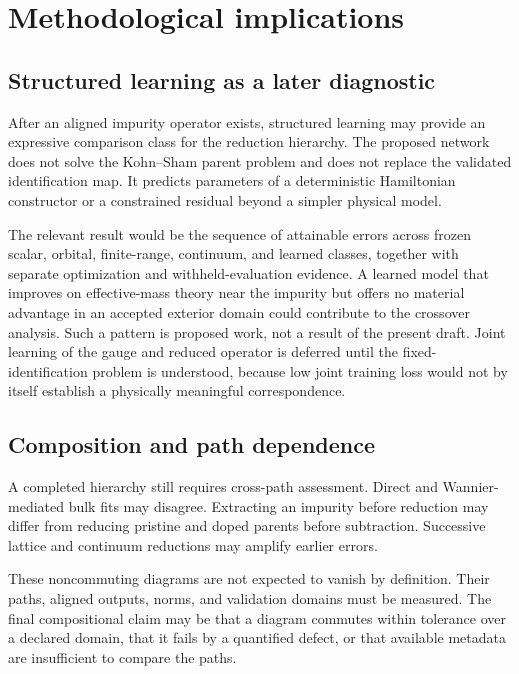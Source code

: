 \section{Methodological implications}

\subsection{Structured learning as a later diagnostic}

After an aligned impurity operator exists, structured learning may provide an
expressive comparison class for the reduction hierarchy. The proposed network
does not solve the Kohn--Sham parent problem and does not replace the validated
identification map. It predicts parameters of a deterministic Hamiltonian
constructor or a constrained residual beyond a simpler physical model.

The relevant result would be the sequence of attainable errors across frozen
scalar, orbital, finite-range, continuum, and learned classes, together with
separate optimization and withheld-evaluation evidence. A learned model that
improves on effective-mass theory near the impurity but offers no material
advantage in an accepted exterior domain could contribute to the crossover
analysis. Such a pattern is proposed work, not a result of the present draft.
Joint learning of the gauge and reduced operator is deferred until the
fixed-identification problem is understood, because low joint training loss
would not by itself establish a physically meaningful correspondence.

\subsection{Composition and path dependence}


A completed hierarchy still requires cross-path assessment. Direct and
Wannier-mediated bulk fits may disagree. Extracting an impurity before reduction
may differ from reducing pristine and doped parents before subtraction.
Successive lattice and continuum reductions may amplify earlier errors.

These noncommuting diagrams are not expected to vanish by definition. Their
paths, aligned outputs, norms, and validation domains must be measured. The
final compositional claim may be that a diagram commutes within tolerance over a
declared domain, that it fails by a quantified defect, or that available
metadata are insufficient to compare the paths.

